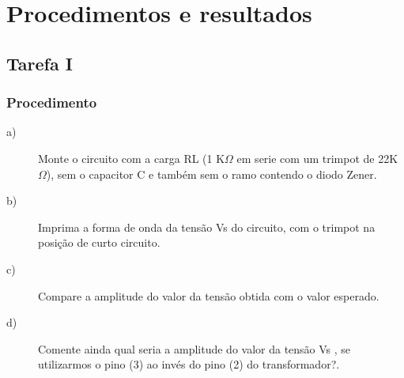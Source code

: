 \setcounter{topnumber}{5}
\setcounter{bottomnumber}{5}
\setcounter{totalnumber}{5}

\chapter{Procedimentos e resultados}

\section{Tarefa I}
\subsection{Procedimento}
\begin{description}
	\item[a)]Monte o circuito com a carga RL (1 K$\Omega$ em serie com um trimpot de 22K$\Omega$), sem o capacitor C e também sem o ramo contendo o diodo Zener.
	\item[b)] Imprima a forma de onda da tensão Vs do circuito, com o trimpot na posição de curto circuito.
	\item[c)] Compare a amplitude do valor da tensão obtida com o valor esperado.
	\item[d)] Comente ainda qual seria a amplitude do valor da tensão Vs , se utilizarmos o pino (3) ao invés do pino (2) do transformador?.
\end{description}
